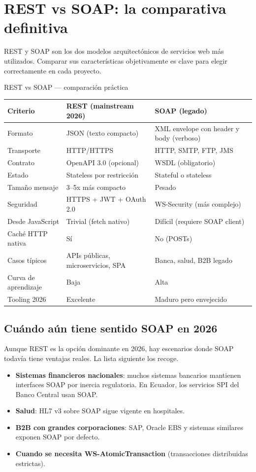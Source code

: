 \section{REST vs SOAP: la comparativa definitiva}

REST y SOAP son los dos modelos arquitectónicos de servicios
web más utilizados. Comparar sus características objetivamente es
clave para elegir correctamente en cada proyecto.


\begin{cajacompara}{REST vs SOAP --- comparación práctica}
\centering\footnotesize
\begin{tabularx}{\textwidth}{lXX}
\toprule
\textbf{Criterio} & \textbf{REST (mainstream 2026)} & \textbf{SOAP (legado)}\\
\midrule
Formato & JSON (texto compacto) & XML envelope con header y body (verboso)\\
Transporte & HTTP/HTTPS & HTTP, SMTP, FTP, JMS\\
Contrato & OpenAPI 3.0 (opcional) & WSDL (obligatorio)\\
Estado & Stateless por restricción & Stateful o stateless\\
Tamaño mensaje & 3--5x más compacto & Pesado\\
Seguridad & HTTPS + JWT + OAuth 2.0 & WS-Security (más complejo)\\
Desde JavaScript & Trivial (fetch nativo) & Difícil (requiere SOAP client)\\
Caché HTTP nativa & Sí & No (POSTs)\\
Casos típicos & APIs públicas, microservicios, SPA & Banca, salud, B2B legado\\
Curva de aprendizaje & Baja & Alta\\
Tooling 2026 & Excelente & Maduro pero envejecido\\
\bottomrule
\end{tabularx}
\end{cajacompara}

\subsection{Cuándo aún tiene sentido SOAP en 2026}

Aunque REST es la opción dominante en 2026, hay escenarios
donde SOAP todavía tiene ventajas reales. La lista siguiente los
recoge.


\begin{itemize}
\item \textbf{Sistemas financieros nacionales}: muchos sistemas
bancarios mantienen interfaces SOAP por inercia regulatoria. En
Ecuador, los servicios SPI del Banco Central usan SOAP.
\item \textbf{Salud}: HL7 v3 sobre SOAP sigue vigente en hospitales.
\item \textbf{B2B con grandes corporaciones}: SAP, Oracle EBS y
sistemas similares exponen SOAP por defecto.
\item \textbf{Cuando se necesita WS-AtomicTransaction} (transacciones
distribuidas estrictas).
\end{itemize}

